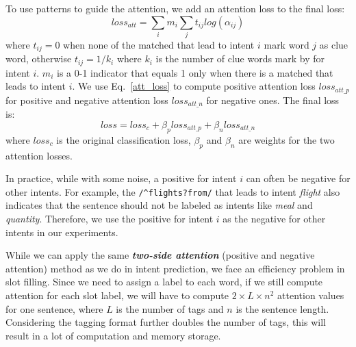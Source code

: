 To use \RE patterns to guide the attention, we add an attention loss to the final loss:
\begin{equation}
loss_{att} = \sum_{i}{m_i\sum_{j}{t_{ij}log(\alpha_{ij})}}
\label{att_loss}
\end{equation}
where $t_{ij} = 0$ when none of the matched \REs that lead to intent $i$ mark word $j$ as clue word, otherwise $t_{ij} = 1/k_{i}$ where $k_i$ is the number of clue words mark by \RE for intent $i$. $m_i$ is a 0-1 indicator that equals 1 only when there is a matched \RE that leads to intent $i$. We use Eq.~\ref{att_loss} to compute positive attention loss $loss_{att\_p}$ for positive \REs and negative attention loss $loss_{att\_n}$ for negative ones. The final loss is:
\begin{equation}
loss = loss_{c} + \beta_p loss_{att\_p} + \beta_n loss_{att\_n}
\end{equation}
where $loss_{c}$ is the original classification loss, $\beta_p$ and $\beta_n$ are weights for the two attention losses.

In practice, while with some noise, a positive \RE for intent $i$ can often be negative \REs for other intents. For example, the \RE \texttt{/\textasciicircum flights?\:from/} that leads to intent \emph{flight} also indicates that the sentence should not be labeled as intents like \emph{meal} and \emph{quantity}.
Therefore, we use the positive \REs for intent $i$ as the negative \REs for other intents in our experiments.

While we can apply the same \textbf{\emph{two-side attention}} (positive and negative attention) method as we do in intent prediction, we
face an efficiency problem in slot filling. Since we need to assign a label to each word, if we still compute attention for each slot label, we
will have to compute $2\times L \times n^2$ attention values for one sentence, where $L$ is the number of tags and $n$ is the sentence
length. Considering the \BIO tagging format further doubles the number of tags, this will result in a lot of computation and memory
storage.

